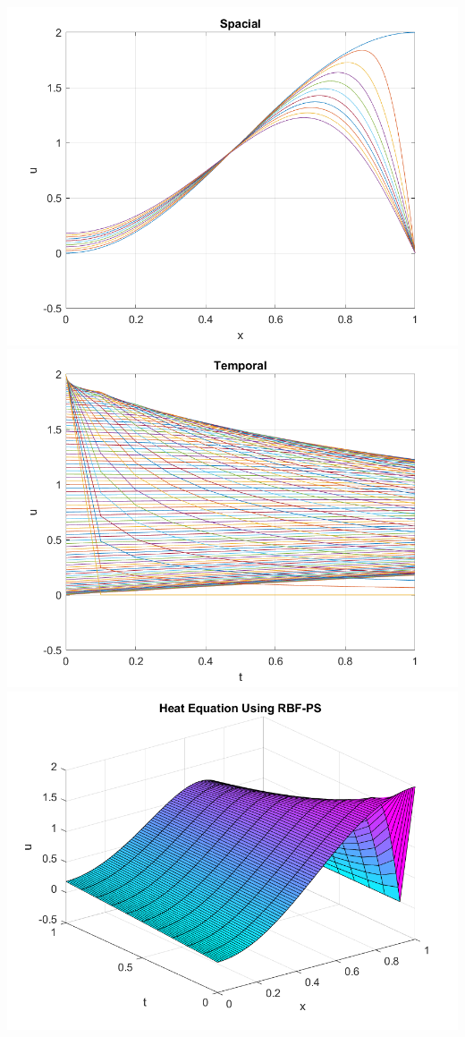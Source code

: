 \begin{solution}
    \begin{center}
        \includegraphics[scale=0.5]{problem3aheatx.png}
        \includegraphics[scale=0.5]{problem3aheatt.png}
        \includegraphics[scale=0.5]{problem3aheat.png}

\end{center}
\end{solution}
